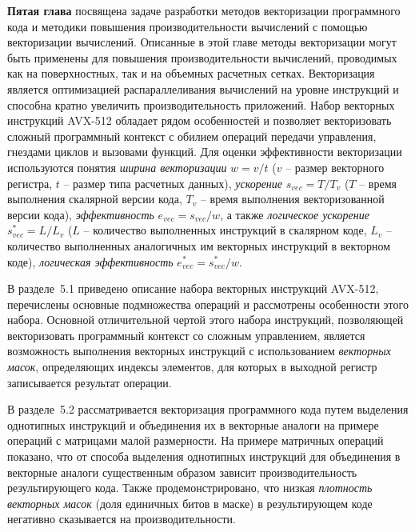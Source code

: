 \documentclass[a4paper,14pt]{extarticle}                     %
\theoremstyle{plain}                                         %
\begin{document}
\textbf{Пятая глава} посвящена задаче разработки методов векторизации программного кода и методики повышения производительности вычислений с помощью векторизации вычислений.
Описанные в этой главе методы векторизации могут быть применены для повышения производительности вычислений, проводимых как на поверхностных, так и на объемных расчетных сетках.
Векторизация является оптимизацией распараллеливания вычислений на уровне инструкций и способна кратно увеличить производительность приложений.
Набор векторных инструкций AVX-512 обладает рядом особенностей и позволяет векторизовать сложный программный контекст с обилием операций передачи управления, гнездами циклов и вызовами функций.
Для оценки эффективности векторизации используются понятия \textit{ширина векторизации} $w = v/t$ ($v$ -- размер векторного регистра, $t$ -- размер типа расчетных данных), \textit{ускорение} $s_{vec} = T/T_v$ ($T$ -- время выполнения скалярной версии кода, $T_v$ -- время выполнения векторизованной версии кода), \textit{эффективность} $e_{vec} = s_{vec}/w$, а также \textit{логическое ускорение} $s_{vec}^{*} = L/L_v$ ($L$ -- количество выполненных инструкций в скалярном коде, $L_v$ -- количество выполненных аналогичных им векторных инструкций в векторном коде), \textit{логическая эффективность} $e_{vec}^{*} = s_{vec}^{*}/w$.


В разделе~5.1 приведено описание набора векторных инструкций AVX-512, перечислены основные подмножества операций и рассмотрены особенности этого набора.
Основной отличительной чертой этого набора инструкций, позволяющей векторизовать программный контекст со сложным управлением, является возможность выполнения векторных инструкций с использованием \textit{векторных масок}, определяющих индексы элементов, для которых в выходной регистр записывается результат операции.


В разделе~5.2 рассматривается векторизация программного кода путем выделения однотипных инструкций и объединения их в векторные аналоги на примере операций с матрицами малой размерности.
На примере матричных операций показано, что от способа выделения однотипных инструкций для объединения в векторные аналоги существенным образом зависит производительность результирующего кода.
Также продемонстрировано, что низкая \textit{плотность векторных масок} (доля единичных битов в маске) в результирующем коде негативно сказывается на производительности.
\end{document}
